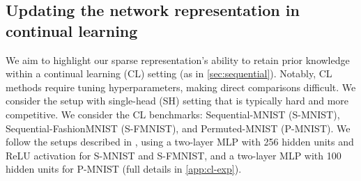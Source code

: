 \documentclass{article}
\makeatletter
\newcommand{\ie}{\textit{i.e.\@}\xspace}
\newcommand{\mbf}[1]{\mathbf{#1}}
\newcommand{\MB}{\mbf{B}}
\newcommand{\MI}{\mbf{I}}
\makeatother
\begin{document}
\subsection{Updating the  network representation in continual learning}
\label{sec:cl-exp}
%
%
%
%
%




We aim to highlight our sparse representation's ability to retain prior knowledge within a continual learning (CL) setting (as in \cref{sec:sequential}). Notably, CL methods require tuning hyperparameters, making direct comparisons difficult. We consider the setup with single-head (SH) setting that is typically hard and more competitive.
%
We consider the CL benchmarks: Sequential-MNIST (S-MNIST), Sequential-FashionMNIST (S-FMNIST), and Permuted-MNIST (P-MNIST). We follow the setups described in \cite{rudner2022continual, pan2020continual}, using a two-layer MLP with 256 hidden units and ReLU activation for S-MNIST and S-FMNIST, and a two-layer MLP with 100 hidden units for P-MNIST (full details in \cref{app:cl-exp}).
\end{document}
